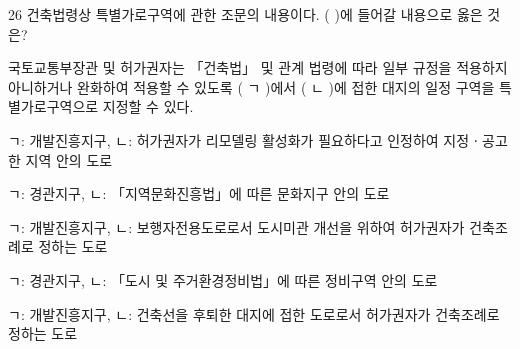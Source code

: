 \begin{question}{26}
건축법령상 특별가로구역에 관한 조문의 내용이다. ( )에 들어갈 내용으로 옳은 것은?
\begin{framedtext}
국토교통부장관 및 허가권자는 「건축법」 및 관계 법령에 따라 일부 규정을 적용하지 아니하거나 완화하여 적용할 수 있도록 ( ㄱ )에서 ( ㄴ )에 접한 대지의 일정 구역을 특별가로구역으로 지정할 수 있다.
\end{framedtext}
\begin{choices}
  \item ㄱ: 개발진흥지구, ㄴ: 허가권자가 리모델링 활성화가 필요하다고 인정하여 지정ㆍ공고한 지역 안의 도로
  \item ㄱ: 경관지구, ㄴ: 「지역문화진흥법」에 따른 문화지구 안의 도로
  \item ㄱ: 개발진흥지구, ㄴ: 보행자전용도로로서 도시미관 개선을 위하여 허가권자가 건축조례로 정하는 도로
  \item ㄱ: 경관지구, ㄴ: 「도시 및 주거환경정비법」에 따른 정비구역 안의 도로
  \item ㄱ: 개발진흥지구, ㄴ: 건축선을 후퇴한 대지에 접한 도로로서 허가권자가 건축조례로 정하는 도로
\end{choices}
\end{question}
